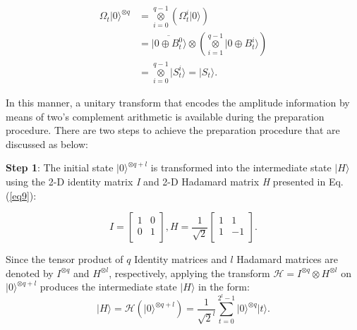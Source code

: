 \documentclass[10pt,journal,compsoc]{IEEEtran}
\begin{document}
\begin{equation}\label{eq8}
\begin{aligned}
\Omega_{t} {\vert 0 \rangle}^{\otimes q} &= \mathop{\otimes} \limits_{i=0}^{q-1} \left( {\Omega^{i}_{t}}{\vert 0 \rangle} \right) \\
&={\vert \overline{0 \oplus B_t^0} \rangle} \otimes \left(\mathop{\otimes} \limits_{i=1}^{q-1} {\vert 0 \oplus B_t^i \rangle}\right)\\
&=\mathop{\otimes} \limits_{i=0}^{q-1} {\vert S_t^i \rangle} = \vert S_t \rangle.
\end{aligned}
\end{equation}

In this manner, a unitary transform that encodes the amplitude information by means of two's complement arithmetic is available during the preparation procedure. There are two steps to achieve the preparation procedure that are discussed as below:

\textbf{Step 1}: The initial state ${\vert 0 \rangle}^{\otimes q + l}$ is transformed into the intermediate state $\vert H \rangle$ using the 2-D identity matrix \emph{I} and 2-D Hadamard matrix \emph{H} presented in Eq. (\ref{eq9}):

\begingroup
\renewcommand\arraystretch{1.2}
\renewcommand\arraycolsep{5.0pt}
\begin{equation}\label{eq9}
I =
\left[
  \begin{array}{cc}
    1 & 0\\
    0 & 1\\
  \end{array}
\right],
H = \frac{1}{\sqrt{2}}
\left[
  \begin{array}{cc}
    1 & 1\\
    1 & -1\\
  \end{array}
\right].
\end{equation}
\endgroup

Since the tensor product of $q$ Identity matrices and $l$ Hadamard matrices are denoted by $I^{\otimes q}$ and $H^{\otimes l}$, respectively, applying the transform $\mathcal{H} = I^{\otimes q} \otimes H^{\otimes l}$ on ${\vert 0 \rangle}^{\otimes q + l}$ produces the intermediate state $\vert H \rangle$ in the form:
\begin{equation}\label{eq10}
\vert H \rangle = \mathcal{H} \left( {\vert 0 \rangle}^{\otimes q + l} \right) = \frac{1}{\sqrt{2}^{l}} {\sum_{t=0}^{2^{l}-1}} {\vert 0 \rangle}^{\otimes q} {\vert t \rangle}.
\end{equation}
\end{document}
